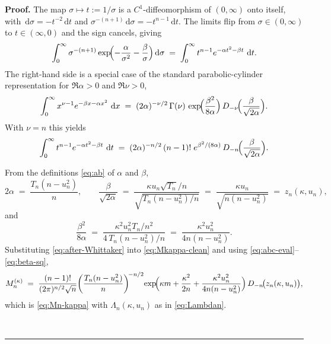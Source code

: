 \documentclass{article}%
\newenvironment{proof}[1][Proof]{\noindent\textbf{#1.} }{\ \rule{0.5em}{0.5em}}
\newcommand{\dd}{\,\mathrm{d}}
\newcommand{\1}{\mathbf{1}}
\begin{document}
\begin{proof}
The map $\sigma\mapsto t:=1/\sigma$ is a $C^1$-diffeomorphism of
$(0,\infty)$ onto itself, with $\dd\sigma=-t^{-2}\dd t$ and
$\sigma^{-(n+1)}\dd\sigma=-t^{n-1}\dd t$. The limits flip from
$\sigma\in(0,\infty)$ to $t\in(\infty,0)$ and the sign cancels, giving
\begin{equation}\label{eq:Whittaker-input}
  \int_0^\infty\sigma^{-(n+1)}
  \exp\!\Bigl(-\frac{\alpha}{\sigma^2}-\frac{\beta}{\sigma}\Bigr)\dd\sigma
  \;=\;\int_0^\infty t^{n-1}e^{-\alpha t^2-\beta t}\,\dd t.
\end{equation}
The right-hand side is a special case of the standard
parabolic-cylinder representation for $\Re\alpha>0$ and $\Re\nu>0$,
\begin{equation}\label{eq:pcyl-int}
  \int_0^\infty x^{\nu-1}e^{-\beta x-\alpha x^2}\,\dd x
  \;=\;(2\alpha)^{-\nu/2}\,\Gamma(\nu)\,
  \exp\!\Bigl(\frac{\beta^2}{8\alpha}\Bigr)\,
  D_{-\nu}\!\Bigl(\frac{\beta}{\sqrt{2\alpha}}\Bigr).
\end{equation}
With $\nu=n$ this yields
\begin{equation}\label{eq:after-Whittaker}
  \int_0^\infty t^{n-1}e^{-\alpha t^2-\beta t}\,\dd t
  \;=\;(2\alpha)^{-n/2}\,(n-1)!\;
  e^{\beta^2/(8\alpha)}\,
  D_{-n}\!\Bigl(\frac{\beta}{\sqrt{2\alpha}}\Bigr).
\end{equation}

From the definitions \eqref{eq:ab} of $\alpha$ and $\beta$,
\begin{equation}\label{eq:abc-eval}
  2\alpha\;=\;\frac{T_n(n-u_n^2)}{n},\qquad
  \frac{\beta}{\sqrt{2\alpha}}
  \;=\;\frac{\kappa u_n\sqrt{T_n}/n}{\sqrt{T_n(n-u_n^2)/n}}
  \;=\;\frac{\kappa u_n}{\sqrt{n(n-u_n^2)}}
  \;=\;z_n(\kappa,u_n),
\end{equation}
and
\begin{equation}\label{eq:beta-sq}
  \frac{\beta^2}{8\alpha}
  \;=\;\frac{\kappa^2 u_n^2 T_n/n^2}{4\,T_n(n-u_n^2)/n}
  \;=\;\frac{\kappa^2 u_n^2}{4n(n-u_n^2)}.
\end{equation}
Substituting \eqref{eq:after-Whittaker} into \eqref{eq:Mkappa-clean}
and using \eqref{eq:abc-eval}--\eqref{eq:beta-sq},
\[
  M_n^{(\kappa)}
  \;=\;\frac{(n-1)!}{(2\pi)^{n/2}\sqrt n}
  \!\left(\frac{T_n(n-u_n^2)}{n}\right)^{\!-n/2}\!
  \exp\!\Bigl(\kappa m+\frac{\kappa^2}{2n}
  +\frac{\kappa^2 u_n^2}{4n(n-u_n^2)}\Bigr)\,
  D_{-n}\!\bigl(z_n(\kappa,u_n)\bigr),
\]
which is \eqref{eq:Mn-kappa} with $\Lambda_n(\kappa,u_n)$ as in
\eqref{eq:Lambdan}.


\end{proof}
\end{document}
